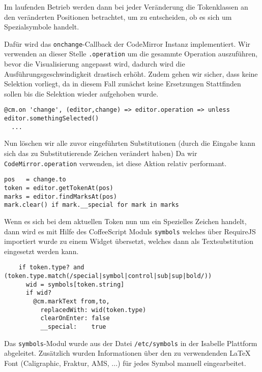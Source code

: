 Im laufenden Betrieb werden dann bei jeder Veränderung die Tokenklassen an den veränderten
Positionen betrachtet, um zu entscheiden, ob es sich um Spezialsymbole handelt.

Dafür wird das \texttt{onchange}-Callback der CodeMirror Instanz implementiert. Wir verwenden an
dieser Stelle \texttt{.operation} um die gesammte Operation auszuführen, bevor die Visualisierung
angepasst wird, dadurch wird die Ausführungsgeschwindigkeit drastisch erhöht. Zudem gehen wir
sicher, dass keine Selektion vorliegt, da in diesem Fall zunächst keine Ersetzungen Stattfinden
sollen bis die Selektion wieder aufgehoben wurde.

\begin{lstlisting}
@cm.on 'change', (editor,change) => editor.operation => unless editor.somethingSelected()
  ...
\end{lstlisting}

Nun löschen wir alle zuvor eingeführten Substitutionen (durch die Eingabe kann sich das zu
Substitutierende Zeichen verändert haben) Da wir \texttt{CodeMirror.operation} verwenden, ist diese
Aktion relativ performant.

\begin{lstlisting}
pos   = change.to
token = editor.getTokenAt(pos)          
marks = editor.findMarksAt(pos)
mark.clear() if mark.__special for mark in marks 
\end{lstlisting}

Wenn es sich bei dem aktuellen Token nun um ein Spezielles Zeichen handelt, dann wird es mit Hilfe
des CoffeeScript Moduls \texttt{symbols} welches über RequireJS importiert wurde zu einem Widget
übersetzt, welches dann als Textsubstitution eingesetzt werden kann.

\begin{lstlisting}            
    if token.type? and (token.type.match(/special|symbol|control|sub|sup|bold/))
      wid = symbols[token.string]
      if wid?
        @cm.markText from,to,          
          replacedWith: wid(token.type)
          clearOnEnter: false
          __special:    true
\end{lstlisting}

Das \texttt{symbols}-Modul wurde aus der Datei \texttt{/etc/symbols} in der Isabelle Plattform
abgeleitet. Zusätzlich wurden Informationen über den zu verwendenden LaTeX Font (Caligraphic,
Fraktur, AMS, ...) für jedes Symbol manuell eingearbeitet.